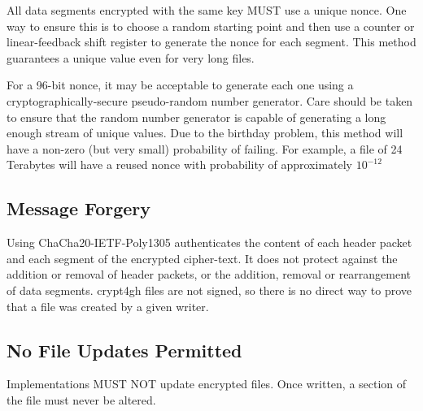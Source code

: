 \documentclass[10pt]{article}
\begin{document}
All data segments encrypted with the same key MUST use a unique nonce.
One way to ensure this is to choose a random starting point and then use a counter or linear-feedback shift
register to generate the nonce for each segment.
This method guarantees a unique value even for very long files.

For a 96-bit nonce, it may be acceptable to generate each one using a cryptographically-secure pseudo-random number
generator.
Care should be taken to ensure that the random number generator is capable of generating a long enough stream
of unique values.
Due to the birthday problem, this method will have a non-zero (but very small) probability of failing.
For example, a file of 24 Terabytes will have a reused nonce with probability of approximately $10^{-12}$

\subsection{Message Forgery}
Using ChaCha20-IETF-Poly1305 authenticates the content of each header packet and each segment of the encrypted
cipher-text.
It does not protect against the addition or removal of header packets, or the addition, removal or rearrangement
of data segments.
crypt4gh files are not signed, so there is no direct way to prove that a file was created by a given writer.

\subsection{No File Updates Permitted}
Implementations MUST NOT update encrypted files.
Once written, a section of the file must never be altered.


\end{document}
